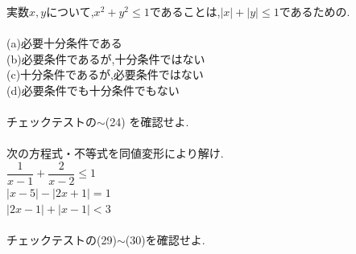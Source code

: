 \documentclass[10pt,fleqn,a4paper]{jsarticle}
\begin{document}
\kakkosan 実数$x,y$について,$x^2+y^2\leq1$であることは,$|x|+|y|\leq1$であるための.\\\\
(a)必要十分条件である\\
(b)必要条件であるが,十分条件ではない\\
(c)十分条件であるが,必要条件ではない\\
(d)必要条件でも十分条件でもない\\\\
\reibanni チェックテストの\kakkojyusan$\sim$(24) を確認せよ.\\\\
\reibansan 次の方程式・不等式を同値変形により解け.\\
\kakkoichi $\dfrac{1}{x-1}+\dfrac{2}{x-2}\leq1$\\
\kakkoni$|x-5|-|2x+1|=1$\\
\kakkosan$|2x-1|+|x-1|<3$\\\\
\reibanshi チェックテストの(29)$\sim$(30)を確認せよ.
\newpage
\end{document}
